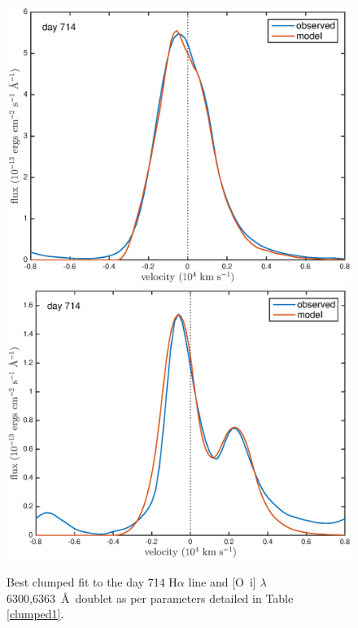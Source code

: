 \documentclass[useAMS,usenatbib,usegraphicx]{mnras}
\begin{document}
 \begin{figure}
\begin{center}
\includegraphics[trim =37 10 45 15,clip=true,scale=0.51]{clump_1/best_fit/d714Ha}
\includegraphics[trim =37 10 45 15,clip=true,scale=0.51]{clump_1/best_fit/d714OI}
\caption{Best clumped fit to the day 714 H$\alpha$ line and [O~{\sc i}] 
$\lambda$6300,6363~\AA\ doublet as per parameters detailed in 
Table \ref{clumped1}.}
\label{d714_c}
\end{center}
\end{figure}
\end{document}
